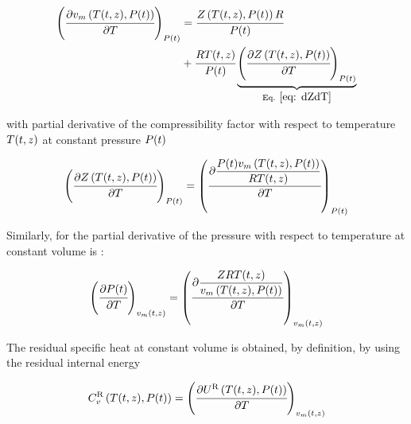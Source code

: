 \documentclass[../Article_Model_Parameters.tex]{subfiles}
\begin{document}
	{\footnotesize
		\begin{align}
			\left( \cfrac{\partial {\color{black}v_m}\left({\color{black}T}(t,z), {\color{black}P}(t)\right)}{\partial {\color{black}T}} \right)_{{\color{black}P}(t)} &= \cfrac{{\color{black}Z}\left({\color{black}T}(t,z), {\color{black}P}(t)\right) {\color{black}R}}{{\color{black}P}(t)} \nonumber \\
			&+ \cfrac{{\color{black}R}{\color{black}T}(t,z)}{{\color{black}P}(t)} \underbrace{\left( \cfrac{\partial {\color{black}Z}\left({\color{black}T}(t,z), {\color{black}P}(t)\right)}{\partial {\color{black}T}} \right)_{{\color{black}P}(t)}}_{\text{Eq. }\eqref{eq: dZdT}} \label{eq: dVdT}
	\end{align} }
	
	with partial derivative of the compressibility factor with respect to temperature ${\color{black}T}(t,z)$ at constant pressure ${\color{black}P}(t)$
	
	{\footnotesize
		\begin{equation}
			\left(\cfrac{\partial{\color{black}Z}\left({\color{black}T}(t,z), {\color{black}P}(t)\right)}{\partial {\color{black}T}}\right)_{{\color{black}P}(t)} = \left(\cfrac{\partial \dfrac{{\color{black}P}(t) {\color{black}v_m}\left({\color{black}T}(t,z), {\color{black}P}(t)\right)}{{\color{black}R}{\color{black}T}(t,z)}}{\partial {\color{black}T}}\right)_{{\color{black}P}(t)} \label{eq: dZdT}
	\end{equation} }
	
	Similarly, for the partial derivative of the pressure with respect to temperature at constant volume is :
	
	{\footnotesize
		\begin{equation}
			\left(\cfrac{\partial {\color{black}P}(t)}{\partial {\color{black}T}}\right)_{{\color{black}v_m}(t,z)} = \left( \cfrac{\partial{\dfrac{{\color{black}Z}{\color{black}R}{\color{black}T}(t,z)}{{\color{black}v_m}\left({\color{black}T}(t,z), {\color{black}P}(t)\right)}}}{\partial{\color{black}T}}\right)_{{\color{black}v_m}(t,z)} \label{eq: dPdT}
	\end{equation} }
	
	The residual specific heat at constant volume is obtained, by definition, by using the residual internal energy
	
	{\footnotesize
		\begin{equation}
			{\color{black}C_v^{\text{R}}}\left({\color{black}T}(t,z),{\color{black}P}(t)\right) = \left(\cfrac{\partial{\color{black}U^{\text{R}}}\left({\color{black}T}(t,z),{\color{black}P}(t)\right)}{\partial {\color{black}T}}\right)_{{\color{black}v_m}(t,z)} \label{eq: CvR}
	\end{equation} }
\end{document}
